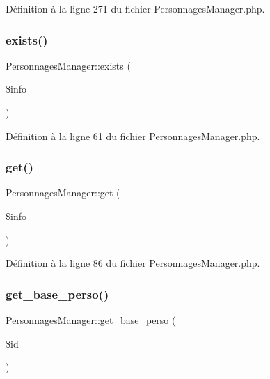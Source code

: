 Définition à la ligne 271 du fichier Personnages\+Manager.\+php.

\mbox{\label{class_personnages_manager_ac6a8e85041681ee0e6c32ade99529273}} 
\subsubsection{\texorpdfstring{exists()}{exists()}}
{\footnotesize\ttfamily Personnages\+Manager\+::exists (\begin{DoxyParamCaption}\item[{}]{\$info }\end{DoxyParamCaption})}



Définition à la ligne 61 du fichier Personnages\+Manager.\+php.

\mbox{\label{class_personnages_manager_af1c8198c1c5179b5d1f86fd56e7187e2}} 
\subsubsection{\texorpdfstring{get()}{get()}}
{\footnotesize\ttfamily Personnages\+Manager\+::get (\begin{DoxyParamCaption}\item[{}]{\$info }\end{DoxyParamCaption})}



Définition à la ligne 86 du fichier Personnages\+Manager.\+php.

\mbox{\label{class_personnages_manager_abe85df761fe398c2d711bdcdb4375a5a}} 
\subsubsection{\texorpdfstring{get\+\_\+base\+\_\+perso()}{get\_base\_perso()}}
{\footnotesize\ttfamily Personnages\+Manager\+::get\+\_\+base\+\_\+perso (\begin{DoxyParamCaption}\item[{}]{\$id }\end{DoxyParamCaption})}



